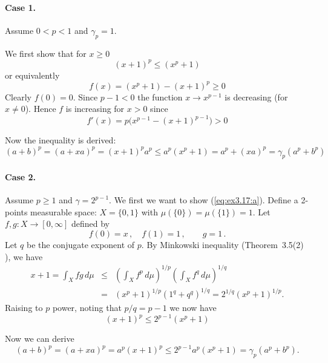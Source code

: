 \begin{enumerate}
\begin{itemize}
 \paragraph{Case 1.} Assume \(0<p<1\) and \(\gamma_p = 1\).

 We first show that for \(x\geq 0\)
 \begin{equation*}
 (x + 1)^p \leq (x^p + 1)
 \end{equation*}
 or equivalently
 \begin{equation*}
 f(x) = (x^p + 1) - (x + 1)^p \geq 0
 \end{equation*}
 Clearly \(f(0) = 0\).
 Since \(p-1 < 0\) the function \(x\to x^{p-1}\) is decreasing (for \(x\neq 0\)).
 Hence $f$ is increasing for \(x>0\) since
 \begin{equation*}
 f'(x) = p\bigl(x^{p-1} - (x+1)^{p-1}\bigr) > 0
 \end{equation*}

 Now the inequality is derived:
 \begin{equation*}
 (a+b)^p =  (a+xa)^p = (x+1)^p a^p
 \leq a^p(x^p + 1)
 =    a^p + (xa)^p
 =    \gamma_p(a^p + b^p)
 \end{equation*}

 \paragraph{Case 2.} Assume \(p\geq 1\) and \(\gamma=2^{p-1}\).
 We first we want to show (\ref{eq:ex3.17:a}).
 Define a 2-points measurable space: \(X=\{0,1\}\)
 with \(\mu(\{0\}) = \mu(\{1\}) = 1\). Let \(f,g:X\to[0,\infty]\)
 defined by
 \begin{equation*}
  f(0) = x\,, \quad f(1) = 1\,, \qquad g = 1\,.
 \end{equation*}
 Let $q$ be the conjugate exponent of $p$.
 By Minkowski inequality (Theorem~3.5(2) \cite{RudinRCA80}), we have
 \begin{eqnarray*}
   x + 1 = \int_X fg\,d\mu
   &\leq&
        \left(\int_X f^p\,d\mu\right)^{1/p}
        \left(\int_X f^q\,d\mu\right)^{1/q} \\
   &=& \left(x^p+1\right)^{1/p} \left(1^q+q^q\right)^{1/q}
   = 2^{1/q} \left(x^p+1\right)^{1/p}.
 \end{eqnarray*}
 Raising to $p$ power, noting that \(p/q = p-1\) we now have
 \begin{equation} \label{eq:ex3.17:a}
  (x+1)^p \leq 2^{p-1} (x^p+1)
 \end{equation}

 Now we can derive
 \begin{equation*}
 (a+b)^p = (a+xa)^p =  a^p (x+1)^p
  \leq 2^{p-1} a^p(x^p + 1) = \gamma_p(a^p + b^p).
 \end{equation*}



\end{itemize}
\end{enumerate}
